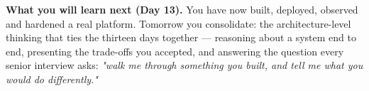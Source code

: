 \begin{keyidea}
\textbf{What you will learn next (Day 13).} You have now built, deployed, observed and hardened a real platform. Tomorrow you consolidate: the architecture-level thinking that ties the thirteen days together --- reasoning about a system end to end, presenting the trade-offs you accepted, and answering the question every senior interview asks: \emph{"walk me through something you built, and tell me what you would do differently."}
\end{keyidea}
